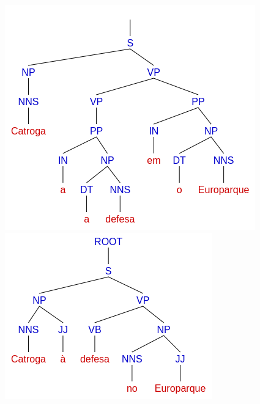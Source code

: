 \begin{figure}[!ht]
    \centering
    \begin{minipage}{.45\textwidth}
        \includegraphics[width=\linewidth]{imagens/ec_cintil_sem_ponto_tree_trans.png}
    \end{minipage}
    \begin{minipage}{.45\textwidth}
        \includegraphics[width=\linewidth]{imagens/ec_cintil_sem_ponto_tree_sp.png}

\end{minipage}
\end{figure}
